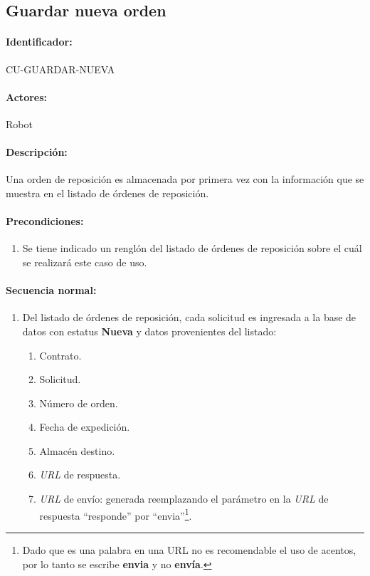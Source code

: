 \subsection{Guardar nueva orden}\label{cu-guardar-nueva}
\paragraph{Identificador:}
CU-GUARDAR-NUEVA
\paragraph{Actores:}
Robot
\paragraph{Descripción:}
Una orden de reposición es almacenada por primera vez con la información que se muestra en el listado de órdenes de reposición.
\paragraph{Precondiciones:}
\begin{enumerate}
  \item Se tiene indicado un renglón del listado de órdenes de reposición sobre el cuál se realizará este caso de uso.
\end{enumerate}
\paragraph{Secuencia normal:}
\begin{enumerate}
  \item Del listado de órdenes de reposición, cada solicitud es ingresada a la base de datos con estatus \textbf{Nueva} y datos provenientes del listado:
  \begin{enumerate}
    \item Contrato.
    \item Solicitud.
    \item Número de orden.
    \item Fecha de expedición.
    \item Almacén destino.
    \item \textit{URL} de respuesta.
    \item \textit{URL} de envío: generada reemplazando el parámetro en la \textit{URL} de respuesta ``responde'' por ``envia''\footnote{Dado que es una palabra en una URL no es recomendable el uso de acentos, por lo tanto se escribe \textbf{envia} y no \textbf{envía}.}.
  \end{enumerate}
\end{enumerate}
